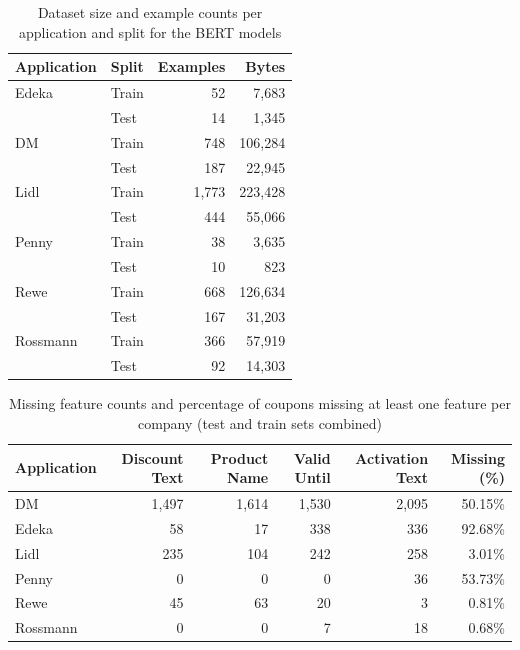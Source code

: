 \documentclass[licencjacka,en]{pracamgr}
\begin{document}
\begin{table}[h!]
\centering
\begin{tabular}{|l|l|r|r|}
\hline
\textbf{Application} & \textbf{Split} & \textbf{Examples} & \textbf{Bytes} \\
\hline
Edeka     & Train & 52  & 7,683 \\
          & Test  & 14  & 1,345 \\
DM        & Train & 748 & 106,284 \\
          & Test  & 187 & 22,945 \\
Lidl      & Train & 1,773 & 223,428 \\
          & Test  & 444  & 55,066 \\
Penny     & Train & 38  & 3,635 \\
          & Test  & 10  & 823 \\
Rewe      & Train & 668 & 126,634 \\
          & Test  & 167 & 31,203 \\
Rossmann  & Train & 366 & 57,919 \\
          & Test  & 92  & 14,303 \\
\hline
\end{tabular}
\caption{Dataset size and example counts per application and split for the BERT models}
\end{table}

\begin{table}[h!]
\raggedright
\setlength{\tabcolsep}{4pt}
\small %
\begin{tabular}{|l|r|r|r|r|r|}
\hline
\textbf{Application} & \textbf{Discount Text} & \textbf{Product Name} & \textbf{Valid Until} & \textbf{Activation Text} & \textbf{Missing (\%)} \\
\hline
DM        & 1,497 & 1,614 & 1,530 & 2,095 & 50.15\% \\
Edeka     & 58    & 17    & 338   & 336   & 92.68\% \\
Lidl      & 235   & 104   & 242   & 258   & 3.01\% \\
Penny     & 0     & 0     & 0     & 36    & 53.73\% \\
Rewe      & 45    & 63    & 20    & 3     & 0.81\% \\
Rossmann  & 0     & 0     & 7     & 18    & 0.68\% \\
\hline
\end{tabular}
\caption{Missing feature counts and percentage of coupons missing at least one feature per company (test and train sets combined)}
\label{tab:missing_coupons}
\end{table}
\end{document}
